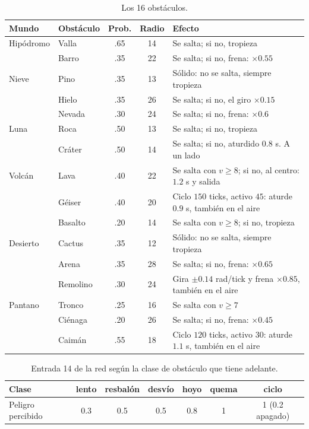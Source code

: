 \documentclass[11pt,letterpaper]{article}
\begin{document}
\begin{table}[h]
\centering
\begin{tabular}{llccl}
\toprule
Mundo & Obstáculo & Prob. & Radio & Efecto \\
\midrule
Hipódromo & Valla & .65 & 14 & Se salta; si no, tropieza \\
 & Barro & .35 & 22 & Se salta; si no, frena: $\times 0.55$ \\
Nieve & Pino & .35 & 13 & Sólido: no se salta, siempre tropieza \\
 & Hielo & .35 & 26 & Se salta; si no, el giro $\times 0.15$ \\
 & Nevada & .30 & 24 & Se salta; si no, frena: $\times 0.6$ \\
Luna & Roca & .50 & 13 & Se salta; si no, tropieza \\
 & Cráter & .50 & 14 & Se salta; si no, aturdido $0.8$ s. A un lado \\
Volcán & Lava & .40 & 22 & Se salta con $v \ge 8$; si no, al centro: $1.2$ s y salida \\
 & Géiser & .40 & 20 & Ciclo $150$ ticks, activo $45$: aturde $0.9$ s, también en el aire \\
 & Basalto & .20 & 14 & Se salta con $v \ge 8$; si no, tropieza \\
Desierto & Cactus & .35 & 12 & Sólido: no se salta, siempre tropieza \\
 & Arena & .35 & 28 & Se salta; si no, frena: $\times 0.65$ \\
 & Remolino & .30 & 24 & Gira $\pm 0.14$ rad/tick y frena $\times 0.85$, también en el aire \\
Pantano & Tronco & .25 & 16 & Se salta con $v \ge 7$ \\
 & Ciénaga & .20 & 26 & Se salta; si no, frena: $\times 0.45$ \\
 & Caimán & .55 & 18 & Ciclo $120$ ticks, activo $30$: aturde $1.1$ s, también en el aire \\
\bottomrule
\end{tabular}
\caption{Los 16 obstáculos.}
\end{table}

\begin{table}[h]
\centering
\begin{tabular}{lcccccc}
\toprule
Clase & lento & resbalón & desvío & hoyo & quema & ciclo \\
\midrule
Peligro percibido & 0.3 & 0.5 & 0.5 & 0.8 & 1 & 1 (0.2 apagado) \\
\bottomrule
\end{tabular}
\caption{Entrada 14 de la red según la clase de obstáculo que tiene adelante.}
\label{tab:peligro}
\end{table}
\end{document}
